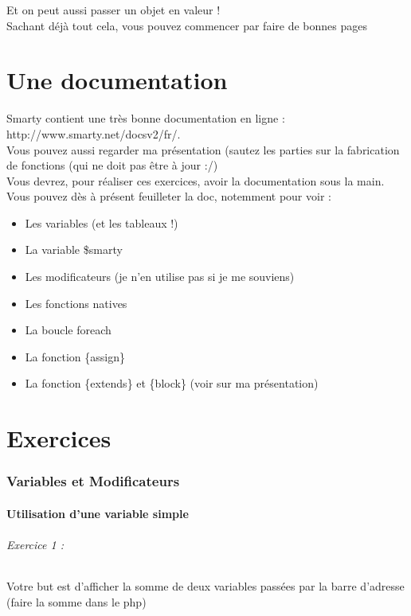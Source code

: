 \documentclass[10pt,a4paper]{article}
\begin{document}
	Et on peut aussi passer un objet en valeur !\\
	Sachant déjà tout cela, vous pouvez commencer par faire de bonnes pages
		
	\newpage
	\part{Une documentation}
	Smarty contient une très bonne documentation en ligne : http://www.smarty.net/docsv2/fr/.\\
	
	Vous pouvez aussi regarder ma présentation (sautez les parties sur la fabrication de fonctions (qui ne doit pas être à jour :/)\\
	
	Vous devrez, pour réaliser ces exercices, avoir la documentation sous la main.\\
	
	Vous pouvez dès à présent feuilleter la doc, notemment pour voir :
	\begin{itemize}
		\item Les variables (et les tableaux !)
		\item La variable \$smarty
		\item Les modificateurs (je n'en utilise pas si je me souviens)
		\item Les fonctions natives
		\item La boucle foreach
		\item La fonction \{assign\}
		\item La fonction \{extends\} et \{block\} (voir sur ma présentation)
	\end{itemize}
	\newpage
	\part{Exercices}
	\section{Variables et Modificateurs}
		\subsection{Utilisation d'une variable simple}
			\paragraph{Exercice 1 :} Votre but est d'afficher la somme de deux variables passées par la barre d'adresse (faire la somme dans le php)
\end{document}
